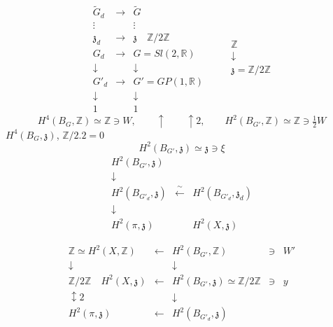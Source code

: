 \documentclass[11pt,a4paper]{article}
\begin{document}
\[
\begin{array}{ccc}
\tilde G_d & \to & \tilde G \\
\vdots & & \vdots \\
\mathfrak{z}_d & \to & \mathfrak{z} \quad \mathbb{Z}/2\mathbb{Z} \\
G_d & \to & G = Sl(2,\mathbb{R}) \\
\downarrow & & \downarrow \\
G'_d & \to & G' = GP(1,\mathbb{R}) \\
\downarrow & & \downarrow \\
1 & & 1
\end{array}
\qquad
\begin{array}{c}
\mathbb{Z} \\ \downarrow \\ \mathfrak{z} = \mathbb{Z}/2\mathbb{Z}
\end{array}
\]
\[
H^4(B_G,\mathbb{Z}) \simeq \mathbb{Z} \ni W, \qquad
\uparrow \qquad \uparrow 2, \qquad
H^2(B_{G'},\mathbb{Z}) \simeq \mathbb{Z} \ni \tfrac12 W
\]
 \quad $H^4(B_G,\mathfrak{z})$, \; $\mathbb{Z}/2.2 = 0$
\[
H^2(B_{G'},\mathfrak{z}) \simeq \mathfrak{z} \ni \xi
\]
\[
\begin{array}{ccc}
H^2(B_{G'},\mathfrak{z}) & & \\
\downarrow & & \\
H^2(B_{G'_d},\mathfrak{z}) & \xleftarrow{\;\sim\;} & H^2(B_{G'_d},\mathfrak{z}_d) \\
\downarrow & & \\
H^2(\pi,\mathfrak{z}) & & H^2(X,\mathfrak{z})
\end{array}
\]

\[
\begin{array}{ccccc}
\mathbb{Z} \simeq H^2(X,\mathbb{Z}) & \leftarrow & H^2(B_{G'},\mathbb{Z}) & \ni & W' \\
\downarrow & & \downarrow & & \\
\mathbb{Z}/2\mathbb{Z} \quad H^2(X,\mathfrak{z}) & \leftarrow & H^2(B_{G'},\mathfrak{z}) \simeq \mathbb{Z}/2\mathbb{Z} & \ni & y \\
\updownarrow 2 & & \downarrow & & \\
H^2(\pi,\mathfrak{z}) & \leftarrow & H^2(B_{G'_d},\mathfrak{z}) & &
\end{array}
\]
\end{document}
